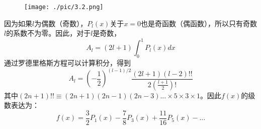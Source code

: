 \documentclass[12pt]{book}
\numberwithin{equation}{chapter}
\numberwithin{figure}{chapter}
\numberwithin{footnote}{page}
\begin{document}
\begin{figure}[!ht]
    \centering
    \texttt{[image: ./pic/3.2.png]}
    \captionsetup{justification=raggedright, singlelinecheck=false}
    \caption{}
    \label{fig:3.2}
\end{figure}

因为如果$l$为偶数（奇数），$P_l(x)$关于$x=0$也是奇函数（偶函数），所以只有奇数$l$的系数不为零。因此，对于$l$是奇数，
\begin{equation}\label{eq:3.25}
    A_l=(2l+1)\int_0^1 P_l(x)dx
\end{equation}
通过罗德里格斯方程可以计算积分，得到
\begin{equation}\label{eq:3.26}
    A_l=(-\frac{1}{2})^{(l-1)/2}\frac{(2l+1)(l-2)!!}{2(\frac{l+1}{2})!}
\end{equation}
其中$(2n+1)!!\equiv(2n+1)(2n-1)(2n-3)\dots\times5\times3\times1$。因此$f(x)$的级数表达为：
\begin{equation}\label{eq:3.27}
    f(x)=\frac{3}{2}P_1(x)-\frac{7}{8}P_3(x)+\frac{11}{16}P_5(x)-\dots
\end{equation}
\end{document}
